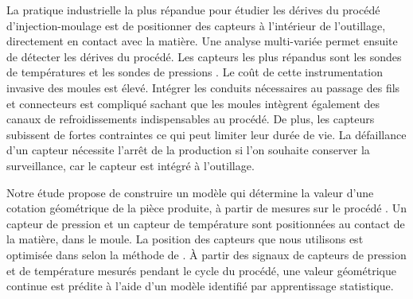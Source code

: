 La pratique industrielle la plus répandue pour étudier les dérives du procédé d'injection-moulage est de positionner des capteurs à l’intérieur de l'outillage, directement en contact avec la matière.
Une analyse multi-variée permet ensuite de détecter les dérives du procédé.
Les capteurs les plus répandus sont les sondes de températures et les sondes de pressions \cite{kurt_experimental_2009}.
Le coût de cette instrumentation invasive des moules est élevé.
Intégrer les conduits nécessaires au passage des fils et connecteurs est compliqué sachant que les moules intègrent également des canaux de refroidissements indispensables au procédé.
De plus, les capteurs subissent de fortes contraintes ce qui peut limiter leur durée de vie.
La défaillance d'un capteur nécessite l'arrêt de la production si l'on souhaite conserver la surveillance, car le capteur est intégré à l'outillage.


Notre étude  propose de construire un modèle qui détermine la valeur d'une cotation géométrique de la pièce produite, à partir de mesures sur le procédé \cite{nagorny_quality_2017}.
Un capteur de pression et un capteur de température sont positionnées au contact de la matière, dans le moule.
La position des capteurs que nous utilisons est optimisée dans selon la méthode de \citeauthor{agazzi_optimal_2013} \cite{agazzi_optimal_2013}.
À partir des signaux de capteurs de pression et de température mesurés pendant le cycle du procédé, une valeur géométrique continue est prédite à l'aide d'un modèle identifié par apprentissage statistique.

